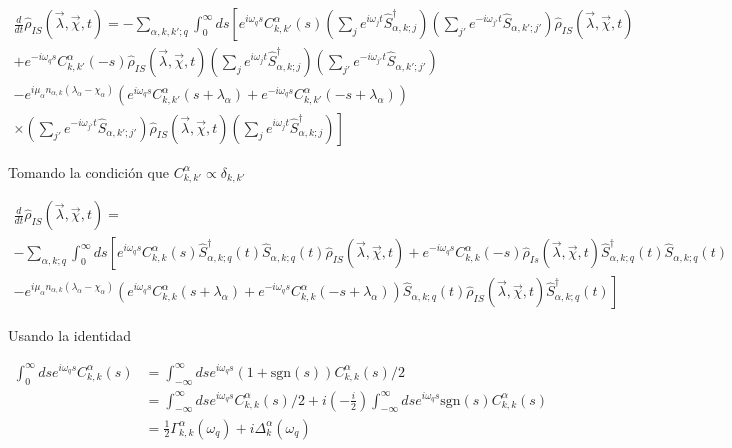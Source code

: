 \begin{appendixs}
\begin{multline*}
    \frac{d}{dt}\hat{\rho}_{IS}(\vec{\lambda},\vec{\chi},t) = - \sum_{\alpha,k,k';q} \int_{0}^{\infty}ds \left[e^{i\omega_{q}s}C^{\alpha}_{k,k'}(s) \left(\sum_{j}e^{i\omega_{j}t}\hat{S}^{\dagger}_{\alpha,k;j} \right)\left(\sum_{j'}e^{-i\omega_{j'}t}\hat{S}_{\alpha,k';j'} \right)\hat{\rho}_{IS}(\vec{\lambda},\vec{\chi},t)  \right. \\
    \left. +  e^{-i\omega_{q}s}C^{\alpha}_{k,k'}(-s) \hat{\rho}_{IS}(\vec{\lambda},\vec{\chi},t) \left(\sum_{j}e^{i\omega_{j}t}\hat{S}^{\dagger}_{\alpha,k;j} \right)\left(\sum_{j'}e^{-i\omega_{j'}t}\hat{S}_{\alpha,k';j'} \right)\right. \\
    \left. - e^{i\mu_{\alpha}n_{\alpha,k}(\lambda_{\alpha}-\chi_{\alpha})}(e^{i\omega_{q}s}C^{\alpha}_{k,k'}(s+\lambda_{\alpha}) + e^{-i\omega_{q}s}C^{\alpha}_{k,k'}(-s+\lambda_{\alpha}) ) \right.\\
    \left.\times \left(\sum_{j'}e^{-i\omega_{j'}t}\hat{S}_{\alpha,k';j'} \right)\hat{\rho}_{IS}(\vec{\lambda},\vec{\chi},t) \left(\sum_{j}e^{i\omega_{j}t}\hat{S}^{\dagger}_{\alpha,k;j} \right)    \right]    
\end{multline*}

Tomando la condición que $C_{k,k'}^{\alpha} \propto \delta_{k,k'}$

\begin{multline*}
    \frac{d}{dt}\hat{\rho}_{IS}(\vec{\lambda},\vec{\chi},t) = \\
     - \sum_{\alpha,k;q} \int_{0}^{\infty}ds \left[e^{i\omega_{q}s}C^{\alpha}_{k,k}(s) \hat{S}^{\dagger}_{\alpha,k;q}(t)\hat{S}_{\alpha,k;q}(t)\hat{\rho}_{IS}(\vec{\lambda},\vec{\chi},t)  +  e^{-i\omega_{q}s}C^{\alpha}_{k,k}(-s) \hat{\rho}_{Is}(\vec{\lambda},\vec{\chi},t) \hat{S}^{\dagger}_{\alpha,k;q}(t) \hat{S}_{\alpha,k;q}(t) \right. \\
    \left. - e^{i\mu_{\alpha}n_{\alpha,k}(\lambda_{\alpha}-\chi_{\alpha})}(e^{i\omega_{q}s}C^{\alpha}_{k,k}(s+\lambda_{\alpha}) + e^{-i\omega_{q}s}C^{\alpha}_{k,k}(-s+\lambda_{\alpha}) ) \hat{S}_{\alpha,k;q}(t) \hat{\rho}_{IS}(\vec{\lambda},\vec{\chi},t) \hat{S}^{\dagger}_{\alpha,k;q}(t)    \right]    
\end{multline*}

Usando la identidad 

\begin{align*}
    \int_{0}^{\infty}ds e^{i\omega_{q}s}C^{\alpha}_{k,k}(s) & = \int_{-\infty}^{\infty}ds e^{i\omega_{q}s}(1+\text{sgn}(s))C^{\alpha}_{k,k}(s)/2 \\
    & = \int_{-\infty}^{\infty}ds e^{i\omega_{q}s}C^{\alpha}_{k,k}(s)/2 + i \left(-\frac{i}{2} \right) \int_{-\infty}^{\infty}ds e^{i\omega_{q}s} \text{sgn}(s)C^{\alpha}_{k,k}(s) \\
    & = \frac{1}{2}\Gamma_{k,k}^{\alpha}(\omega_{q}) + i \Delta^{\alpha}_{k}(\omega_{q})
\end{align*}


\end{appendixs}
